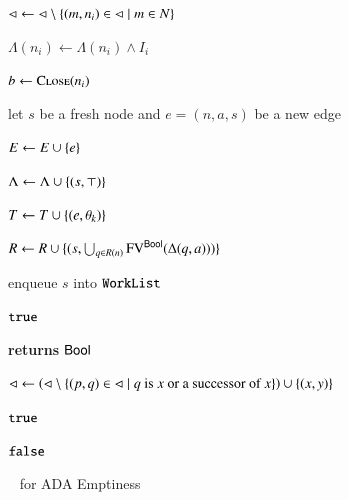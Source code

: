 \documentclass[10pt,conference,letterpaper,twocolumn]{IEEEtran}
\begin{document}
\begin{algorithm}[t!]
{\begin{algorithmic}[1]


  \State $\lhd \leftarrow \lhd \setminus \left\{ (m,n_i) \in \lhd \mid m \in N \right\}$

  \State $\Lambda(n_i) \leftarrow \Lambda(n_i) \wedge I_i$


  \State $b \leftarrow \Call{Close}{n_i}$
  \label{ln:refine-end}

  \EndIf %

  \EndIf %

  \EndFor 

  \EndIf %


  \label{ln:expand-begin}

  \State let $s$ be a fresh node and $e = (n,a,s)$ be a new edge

  \State $E \leftarrow E \cup \left\{ e \right\}$
  \label{ln:edge-insert}

  \State $\Lambda \leftarrow \Lambda \cup \left\{ (s,\top) \right\}$

  \State $T \leftarrow T \cup \left\{ (e, \theta_k) \right\}$

  \State $R \leftarrow R \cup \{(s,\bigcup_{q \in R(n)}\mathrm{FV}^{\mathsf{Bool}}(\Delta(q,a)))\}$

  \State enqueue $s$ into $\mathtt{WorkList}$
  \label{ln:expand-end}

  \EndFor

  \EndIf %

  \EndWhile  

   $\mathtt{true}$
\end{algorithmic}

\begin{algorithmic}[1]
 {\bf returns} $\mathsf{Bool}$



\State $\lhd \leftarrow \left(\lhd \setminus \left\{  (p,q) \in \lhd \mid
  \text{$q$ is $x$ or a successor of $x$} \right\}\right) \cup \left\{ (x,y) \right\}$
\label{ln:close-uncover}

 $\mathtt{true}$ 

\EndIf

\EndFor

 $\mathtt{false}$

\EndFunction
\end{algorithmic}}
\caption{\impact~ for ADA Emptiness}
\label{alg:impact}
\end{algorithm}
\end{document}
